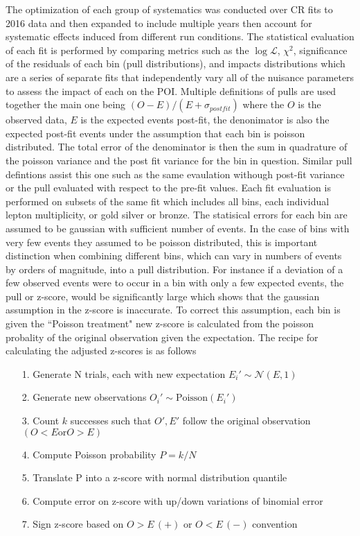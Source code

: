 The optimization of each group of systematics was conducted over CR fits to 2016 data and then expanded to include multiple years then account for systematic effects induced from different run conditions. The statistical evaluation of each fit is performed by comparing metrics such as the $\log\mathcal{L}$, $\chi^2$, significance of the residuals of each bin (pull distributions), and impacts distributions which are a series of separate fits that independently vary all of the nuisance parameters to assess the impact of each on the POI. Multiple definitions of pulls are used together the main one being $ (O-E)/(E+\sigma_{postfit})$ where the $O$ is the observed data, $E$ is the expected events post-fit, the denonimator is also the expected post-fit events under the assumption that each bin is poisson distributed. The total error of the denominator is then the sum in quadrature of the poisson variance and the post fit variance for the bin in question. Similar pull defintions assist this one such as the same evaulation withough post-fit variance or the pull evaluated with respect to the pre-fit values. Each fit evaluation is performed on subsets of the same fit which includes all bins, each individual lepton multiplicity, or gold silver or bronze. The statisical errors for each bin are assumed to be gaussian with sufficient number of events. In the case of bins with very few events they assumed to be poisson distributed, this is important distinction when combining different bins, which can vary in numbers of events by orders of magnitude, into a pull distribution. For instance if a deviation of a few observed events were to occur in a bin with only a few expected events, the pull or z-score, would be significantly large which shows that the gaussian assumption in the z-score is inaccurate. To correct this assumption, each bin is given the ``Poisson treatment" new z-score is calculated from the poisson probality of the original observation given the expectation. The recipe for calculating the adjusted z-scores is as follows
\begin{itemize}
\item[1.] Generate N trials, each with new expectation $E_i' \sim \mathcal{N}(E,1)$
\item[2.] Generate new observations $O_i'\sim \text{Poisson}(E_i')$
\item[3.] Count $k$ successes such that $O',E'$ follow the original observation $(O<E \text{or} O>E)$
\item[4.] Compute Poisson probability $P=k/N$ 
\item[5.] Translate P into a z-score with normal distribution quantile
\item[6.] Compute error on z-score with up/down variations of binomial error
\item[7.] Sign z-score based on $O>E \, (+)$ or $O<E \, (-)$ convention
\end{itemize} 


